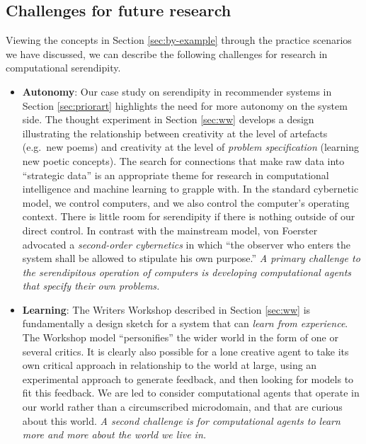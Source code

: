 \subsection{Challenges for future research} \label{sec:recommendations}

Viewing the concepts in Section \ref{sec:by-example} through the
practice scenarios we have discussed, we can describe the following
challenges for research in computational serendipity.

\begin{itemize}
\item \textbf{Autonomy}: Our case study on serendipity in recommender systems in Section \ref{sec:priorart} highlights the need for more autonomy on the system side. The thought experiment in Section
  \ref{sec:ww} develops a design illustrating the relationship between
  creativity at the level of artefacts (e.g.~new poems) and creativity
  at the level of \emph{problem specification} (learning new poetic
  concepts).  The search for connections that make raw data into
  ``strategic data'' is an appropriate theme for research in
  computational intelligence and machine learning to grapple with.  In
  the standard cybernetic model, we control computers, and we also
  control the computer's operating context.  There is little room for
  serendipity if there is nothing outside of our direct control.  In
  contrast with the mainstream model, von Foerster
  \citeyear[p. 286]{von2003cybernetics} advocated a \emph{second-order
    cybernetics} in which ``the observer who enters the system shall
  be allowed to stipulate his own purpose.''  \emph{A primary
    challenge to the serendipitous operation of computers is
    developing computational agents that specify their own problems.}
\end{itemize}

\begin{itemize}
\item \textbf{Learning}: The Writers Workshop described in Section
  \ref{sec:ww} is fundamentally a design sketch for a system
  that can \emph{learn from experience}.  The Workshop model
  ``personifies'' the wider world in the form of one or several
  critics.  It is clearly also possible for a lone creative agent to
  take its own critical approach in relationship to the world at
  large, using an experimental approach to generate feedback, and then
  looking for models to fit this feedback.   We are led to consider 
  computational agents that operate in our world rather
  than a circumscribed microdomain, and that are curious about this
  world.  \emph{A second challenge is for computational agents to
    learn more and more about the world we live in.}
\end{itemize}

